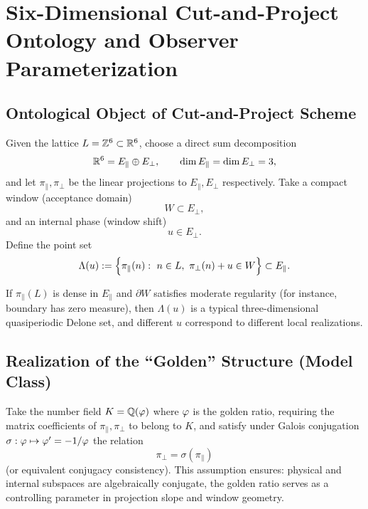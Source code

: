 \section{Six-Dimensional Cut-and-Project Ontology and Observer Parameterization}

\subsection{Ontological Object of Cut-and-Project Scheme}

\begin{definition}\label{def:cap-data}
Given the lattice $L=\mathbb{Z}^6\subset\mathbb{R}^6$, choose a direct sum decomposition
\[
\mathbb{R}^6=E_{\parallel}\oplus E_{\perp},\qquad \dim E_{\parallel}=\dim E_{\perp}=3,
\]
and let $\pi_{\parallel},\pi_{\perp}$ be the linear projections to $E_{\parallel},E_{\perp}$ respectively. Take a compact window (acceptance domain)
\[
W\subset E_{\perp},
\]
and an internal phase (window shift)
\[
u\in E_{\perp}.
\]
Define the point set
\[
\Lambda(u):=\Bigl\{\pi_{\parallel}(n):\ n\in L,\ \pi_{\perp}(n)+u\in W\Bigr\}\subset E_{\parallel}.
\]
\end{definition}

\begin{remark}
If $\pi_{\parallel}(L)$ is dense in $E_{\parallel}$ and $\partial W$ satisfies moderate regularity (for instance, boundary has zero measure), then $\Lambda(u)$ is a typical three-dimensional quasiperiodic Delone set, and different $u$ correspond to different local realizations.
\end{remark}

\subsection{Realization of the ``Golden'' Structure (Model Class)}

\begin{assumption}\label{assump:golden-field}
Take the number field $K=\mathbb{Q}(\varphi)$ where $\varphi$ is the golden ratio, requiring the matrix coefficients of $\pi_{\parallel},\pi_{\perp}$ to belong to $K$, and satisfy under Galois conjugation $\sigma:\varphi\mapsto \varphi'=-1/\varphi$ the relation
\[
\pi_{\perp}=\sigma(\pi_{\parallel})
\]
(or equivalent conjugacy consistency). This assumption ensures: physical and internal subspaces are algebraically conjugate, the golden ratio serves as a controlling parameter in projection slope and window geometry.
\end{assumption}

